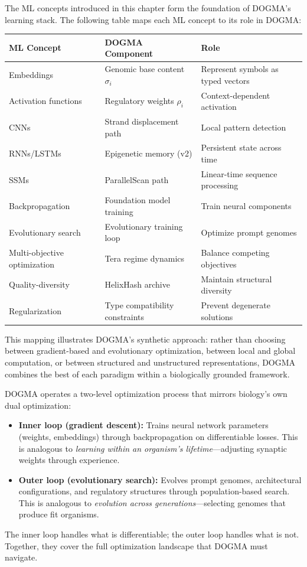 The ML concepts introduced in this chapter form the foundation of DOGMA's learning stack. The following table maps each ML concept to its role in DOGMA:

\begin{center}
\renewcommand{\arraystretch}{1.15}
\begin{tabularx}{0.95\textwidth}{L{3.8cm} L{4cm} Y}
\toprule
\textbf{ML Concept} & \textbf{DOGMA Component} & \textbf{Role} \\
\midrule
Embeddings & Genomic base content $\sigma_i$ & Represent symbols as typed vectors \\
Activation functions & Regulatory weights $\rho_i$ & Context-dependent activation \\
CNNs & Strand displacement path & Local pattern detection \\
RNNs/LSTMs & Epigenetic memory (v2) & Persistent state across time \\
SSMs & ParallelScan path & Linear-time sequence processing \\
Backpropagation & Foundation model training & Train neural components \\
Evolutionary search & Evolutionary training loop & Optimize prompt genomes \\
Multi-objective optimization & Tera regime dynamics & Balance competing objectives \\
Quality-diversity & HelixHash archive & Maintain structural diversity \\
Regularization & Type compatibility constraints & Prevent degenerate solutions \\
\bottomrule
\end{tabularx}
\end{center}

This mapping illustrates DOGMA's synthetic approach: rather than choosing between gradient-based and evolutionary optimization, between local and global computation, or between structured and unstructured representations, DOGMA combines the best of each paradigm within a biologically grounded framework.

\begin{keyinsight}
DOGMA operates a two-level optimization process that mirrors biology's own dual optimization:
\begin{itemize}[leftmargin=1.5em]
  \item \textbf{Inner loop (gradient descent):} Trains neural network parameters (weights, embeddings) through backpropagation on differentiable losses. This is analogous to \emph{learning within an organism's lifetime}---adjusting synaptic weights through experience.
  \item \textbf{Outer loop (evolutionary search):} Evolves prompt genomes, architectural configurations, and regulatory structures through population-based search. This is analogous to \emph{evolution across generations}---selecting genomes that produce fit organisms.
\end{itemize}
The inner loop handles what is differentiable; the outer loop handles what is not. Together, they cover the full optimization landscape that DOGMA must navigate.
\end{keyinsight}


